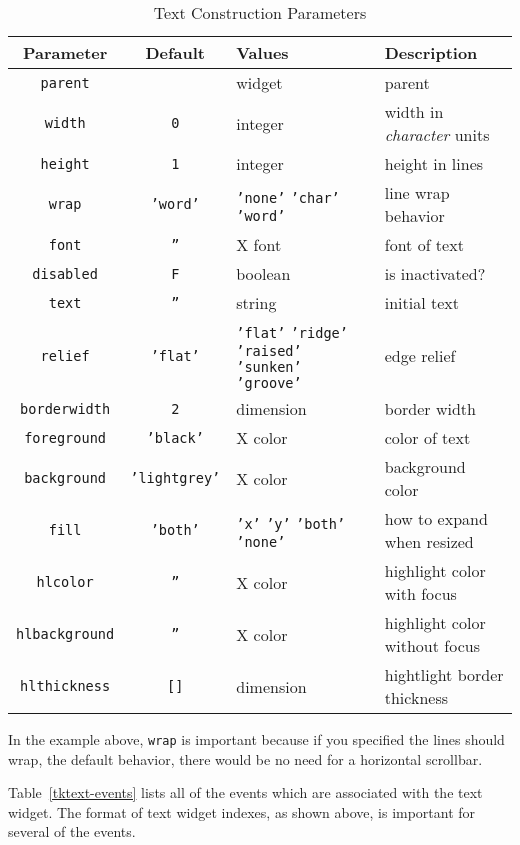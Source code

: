 \begin{table}[tbh]
{\small
\begin{center}
\begin{tabular}{|c|c|p{1.6in}|p{1.9in}|}
\hline
Parameter & Default & Values & Description \\
\hline
\hline
{\tt parent}		& 		& widget & parent \\ \hline
{\tt width}		& {\tt 0}	& integer & width in {\em character} units\\ \hline
{\tt height}		& {\tt 1}	& integer & height in lines \\ \hline
{\tt wrap}		& {\tt 'word'}	& {\tt 'none'} {\tt 'char'} {\tt 'word'} & line wrap behavior \\ \hline
{\tt font}		& {\tt ''}	& X font & font of text \\ \hline
{\tt disabled}		& {\tt F}	& boolean & is inactivated? \\ \hline
{\tt text}		& {\tt ''}	& string & initial text \\ \hline
{\tt relief}		& {\tt 'flat'}& {\tt 'flat'} {\tt 'ridge'} {\tt 'raised'} {\tt 'sunken'} {\tt 'groove'} & edge relief \\ \hline
{\tt borderwidth}	& {\tt 2}	& dimension & border width \\ \hline
{\tt foreground}	& {\tt 'black'}	& X color & color of text \\ \hline
{\tt background}	& {\tt 'lightgrey'}& X color & background color \\ \hline
{\tt fill}		& {\tt 'both'}	& {\tt 'x'} {\tt 'y'} {\tt 'both'} {\tt 'none'} & how to expand when resized \\ \hline
{\tt hlcolor}		& {\tt ''}	& X color & highlight color with focus \\ \hline
{\tt hlbackground}	& {\tt ''}	& X color & highlight color without focus \\ \hline
{\tt hlthickness}	& {\tt []}	& dimension & hightlight border thickness \\ \hline
\end{tabular}
\end{center}
}
\caption{ Text Construction Parameters }
\label{tktext-params}
\end{table}

In the example above, {\tt wrap} is important because if you specified the
lines should wrap, the default behavior, there would be no need for a 
horizontal scrollbar.

Table~\ref{tktext-events} lists all of the events which are associated with the
text widget. The format of text widget indexes, as shown above, is important for
several of the events.

